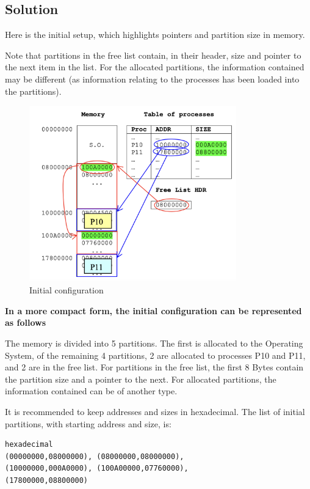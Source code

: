 \subsection{Solution}

Here is the initial setup, which highlights pointers and partition size in memory.

Note that partitions in the free list contain, in their header, size and pointer to the next item in the list. For the allocated partitions, the information contained may be different (as information relating to the processes has been loaded into the partitions).


\begin{figure}[!hbt]
  \includegraphics[width=0.8\textwidth]{images/ex01_initial.png}
  \caption{Initial configuration}
  \label{fig:cont1}
\end{figure}

\textbf{In a more compact form, the initial configuration can be represented as follows}

The memory is divided into 5 partitions. The first is allocated to the Operating System, of the remaining 4 partitions, 2 are allocated to processes P10 and P11, and 2 are in the free list. For partitions in the free list, the first 8 Bytes contain the partition size and a pointer to the next. For allocated partitions, the information contained can be of another type.

It is recommended to keep addresses and sizes in hexadecimal. The list of initial partitions, with starting address and size, is:

\begin{verbatim}
hexadecimal
(00000000,08000000), (08000000,08000000), 
(10000000,000A0000), (100A00000,07760000),
(17800000,08800000)
\end{verbatim}


